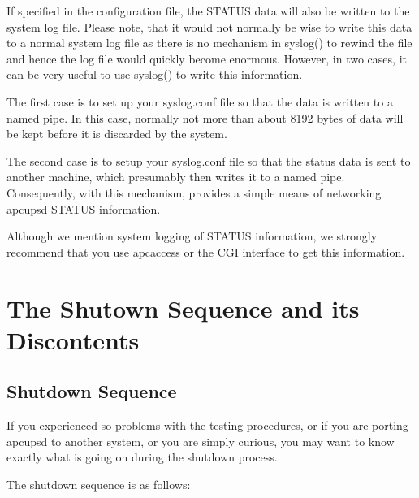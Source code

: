{{{{{{{{{{{{{{{\label{index-Logging-Status-257}
\label{index-Status_002c-Logging-258}
If specified in the configuration file, the STATUS data will also be written
to the system log file. Please note, that it would not normally be wise to
write this data to a normal system log file as there is no mechanism in
syslog() to rewind the file and hence the log file would quickly become
enormous. However, in two cases, it can be very useful to use syslog() to
write this information.  

The first case is to set up your syslog.conf file so that the data is written
to a named pipe. In this case, normally not more than about 8192 bytes of data
will be kept before it is discarded by the system.  

The second case is to setup your syslog.conf file so that the status data is
sent to another machine, which presumably then writes it to a named pipe.
Consequently, with this mechanism, provides a simple means of networking
apcupsd STATUS information.  

Although we mention system logging of STATUS information, we strongly
recommend that you use apcaccess or the CGI interface to get this information.


\label{The-Shutown-Sequence-and-its-Discontents}

\section*{The Shutown Sequence and its Discontents}

\label{index-Shutdown-Sequence-259}

\label{Shutdown-Sequence-_003c1_003e}

\subsection*{Shutdown Sequence}

If you experienced so problems with the testing procedures, or if you are
porting apcupsd to another system, or you are simply curious, you may want to
know exactly what is going on during the shutdown process.  

The shutdown sequence is as follows:  

}}}}}}}}}}}}}}}
